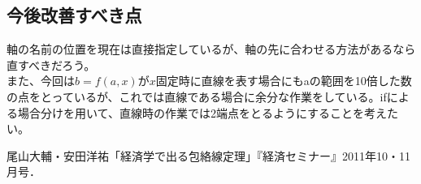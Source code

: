 \documentclass[11pt,a4j,fleqn]{jarticle}
\begin{document}
\subsection{今後改善すべき点}
軸の名前の位置を現在は直接指定しているが、軸の先に合わせる方法があるなら直すべきだろう。\\
また、今回は$b=f(a,x)$が$x$固定時に直線を表す場合にもaの範囲を10倍した数の点をとっているが、これでは直線である場合に余分な作業をしている。ifによる場合分けを用いて、直線時の作業では2端点をとるようにすることを考えたい。\\


\begin{thebibliography}{0}
尾山大輔・安田洋祐「経済学で出る包絡線定理」『経済セミナー』2011年10・11月号．
\end{thebibliography}
\end{document}
